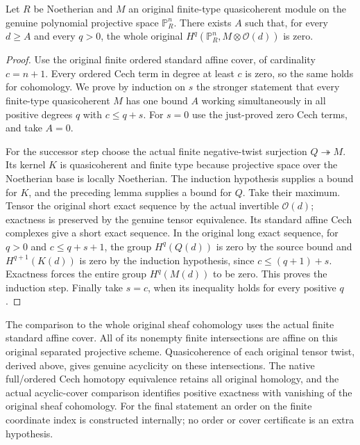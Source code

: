 \begin{theorem}
\label{thm:coherent-projective-serre-vanishing}
\leanok
Let $R$ be Noetherian and $M$ an original finite-type quasicoherent module
on the genuine polynomial projective space $\mathbb P_R^n$. There exists
$A$ such that, for every $d\ge A$ and every $q>0$, the whole original
$H^q(\mathbb P_R^n,M\otimes\mathcal O(d))$ is zero.
\end{theorem}
\begin{proof}
Use the original finite ordered standard affine cover, of cardinality
$c=n+1$. Every ordered Cech term in degree at least $c$ is zero, so the
same holds for cohomology. We prove by induction on $s$ the stronger
statement that every finite-type quasicoherent $M$ has one bound $A$
working simultaneously in all positive degrees $q$ with $c\le q+s$.
For $s=0$ use the just-proved zero Cech terms, and take $A=0$.

For the successor step choose the actual finite negative-twist
surjection $Q\twoheadrightarrow M$. Its kernel $K$ is quasicoherent and
finite type because projective space over the Noetherian base is
locally Noetherian. The induction hypothesis supplies a bound for $K$,
and the preceding lemma supplies a bound for $Q$. Take their maximum.
Tensor the original short exact sequence by the actual invertible
$\mathcal O(d)$; exactness is preserved by the genuine tensor equivalence.
Its standard affine Cech complexes give a short exact sequence. In the
original long exact sequence, for $q>0$ and $c\le q+s+1$, the group
$H^q(Q(d))$ is zero by the source bound and $H^{q+1}(K(d))$ is zero by
the induction hypothesis, since $c\le(q+1)+s$. Exactness forces the
entire group $H^q(M(d))$ to be zero. This proves the induction step.
Finally take $s=c$, when its inequality holds for every positive $q$.
\end{proof}


The comparison to the whole original sheaf cohomology uses the actual
finite standard affine cover. All of its nonempty finite intersections are
affine on this original separated projective scheme. Quasicoherence of each
original tensor twist, derived above, gives genuine acyclicity on these
intersections. The native full/ordered Cech homotopy equivalence retains
all original homology, and the actual acyclic-cover comparison identifies
positive exactness with vanishing of the original sheaf cohomology. For
the final statement an order on the finite coordinate index is constructed
internally; no order or cover certificate is an extra hypothesis.
